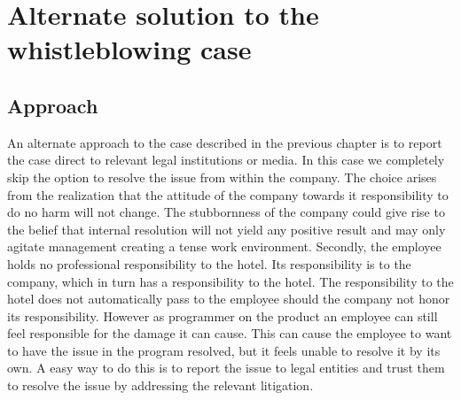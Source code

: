\chapter{Alternate solution to the whistleblowing case}

\section{Approach}
An alternate approach to the case described in the previous chapter is to report the case direct to relevant legal institutions or media. In this case we completely skip the option to resolve the issue from within the company.
The choice arises from the realization that the attitude of the company towards it responsibility to do no harm will not change. The stubbornness of the company could give rise to the belief that internal resolution will not yield any positive result and may only agitate management creating a tense work environment. 
Secondly, the employee holds no professional responsibility to the hotel. Its responsibility is to the company, which in turn has a responsibility to the hotel. The responsibility to the hotel does not automatically pass to the employee should the company not honor its responsibility. 
However as programmer on the product an employee can still feel responsible for the damage it can cause. This can cause the employee to want to have the issue in the program resolved, but it feels unable to resolve it by its own. A easy way to do this is to report the issue to legal entities and trust them to resolve the issue by addressing the relevant litigation. 

